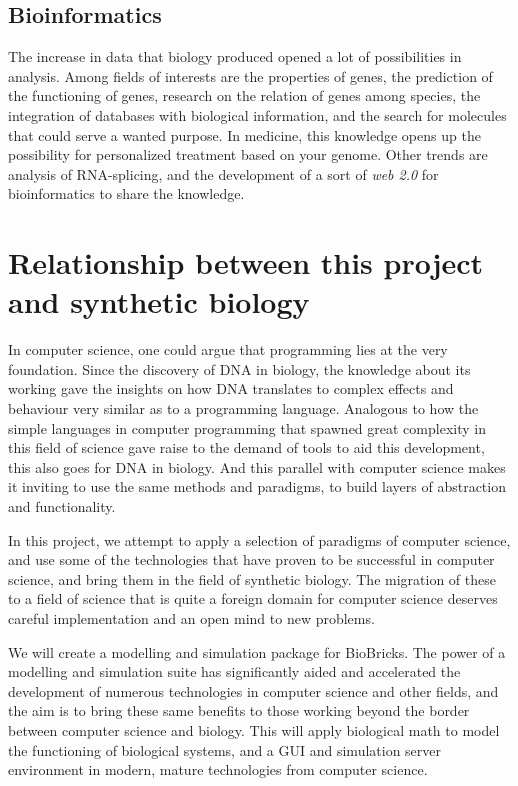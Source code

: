 \documentclass[a4paper]{article}
\begin{document}
\subsection{Bioinformatics}
The increase in data that biology produced opened a lot of possibilities in analysis. Among fields of interests are the properties of genes, the prediction of the functioning of genes, research on the relation of genes among species, the integration of databases with biological information, and the search for molecules that could serve a wanted purpose. In medicine, this knowledge opens up the possibility for personalized treatment based on your genome. Other trends are analysis of RNA-splicing, and the development of a sort of \textit{web 2.0} for bioinformatics to share the knowledge.

\section{Relationship between this project and synthetic biology}

In computer science, one could argue that programming lies at the very foundation. Since the discovery of DNA in biology, the knowledge about its working gave the insights on how DNA translates to complex effects and behaviour very similar as to a programming language. Analogous to how the simple languages in computer programming that spawned great complexity in this field of science gave raise to the demand of tools to aid this development, this  also goes for DNA in biology. And this parallel with computer science makes it inviting to use the same methods and paradigms, to build layers of abstraction and functionality.

In this project, we attempt to apply a selection of paradigms of computer science, and use some of the technologies that have proven to be successful in computer science, and bring them in the field of synthetic biology. The migration of these to a field of science that is quite a foreign domain for computer science deserves careful implementation and an open mind to new problems.

We will create a modelling and simulation package for BioBricks. The power of a modelling and simulation suite has significantly aided and accelerated the development of numerous technologies in computer science and other fields, and the aim is to bring these same benefits to those working beyond the border between computer science and biology. This will apply  biological  math to model the functioning of biological systems, and a GUI and simulation server environment in modern, mature technologies from computer science.
\end{document}
